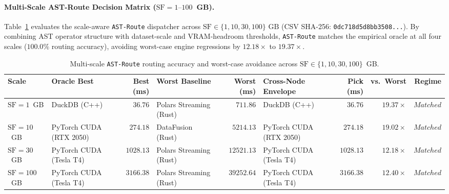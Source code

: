 \documentclass[10pt,a4paper]{article}
\begin{document}
\paragraph{Multi-Scale AST-Route Decision Matrix ($\text{SF}=1\text{--}100$~GB).}
Table~\ref{tab:v13_groupB_multiscale_router} evaluates the scale-aware \texttt{AST-Route} dispatcher across $\text{SF}\in\{1,10,30,100\}\text{ GB}$ (CSV SHA-256: \texttt{0dc718d5d8bb3508...}). By combining AST operator structure with dataset-scale and VRAM-headroom thresholds, \texttt{AST-Route} matches the empirical oracle at all four scales ($100.0\%$ routing accuracy), avoiding worst-case engine regressions by $12.18\times$ to $19.37\times$.

\begin{table}[!t]
\centering
\caption{Multi-scale \texttt{AST-Route} routing accuracy and worst-case avoidance across $\text{SF}\in\{1,10,30,100\}$~GB.}
\label{tab:v13_groupB_multiscale_router}
\scriptsize
\setlength{\tabcolsep}{3.2pt}
\renewcommand{\arraystretch}{1.10}
\begin{tabular}{@{}llrlrlrrr@{}}
\toprule
\textbf{Scale} & \textbf{Oracle Best} & \textbf{Best (ms)} & \textbf{Worst Baseline} & \textbf{Worst (ms)} & \textbf{Cross-Node Envelope} & \textbf{Pick (ms)} & \textbf{vs.\ Worst} & \textbf{Regime} \\
\midrule
$\text{SF}=1$~GB & DuckDB (C++) & $36.76$ & Polars Streaming (Rust) & $711.86$ & DuckDB (C++) & $36.76$ & $19.37\times$ & $Matched$ \\
$\text{SF}=10$~GB & PyTorch CUDA (RTX 2050) & $274.18$ & DataFusion (Rust) & $5214.13$ & PyTorch CUDA (RTX 2050) & $274.18$ & $19.02\times$ & $Matched$ \\
$\text{SF}=30$~GB & PyTorch CUDA (Tesla T4) & $1028.13$ & Polars Streaming (Rust) & $12521.13$ & PyTorch CUDA (Tesla T4) & $1028.13$ & $12.18\times$ & $Matched$ \\
$\text{SF}=100$~GB & PyTorch CUDA (Tesla T4) & $3166.38$ & Polars Streaming (Rust) & $39252.64$ & PyTorch CUDA (Tesla T4) & $3166.38$ & $12.40\times$ & $Matched$ \\
\bottomrule
\end{tabular}
\end{table}
\end{document}
